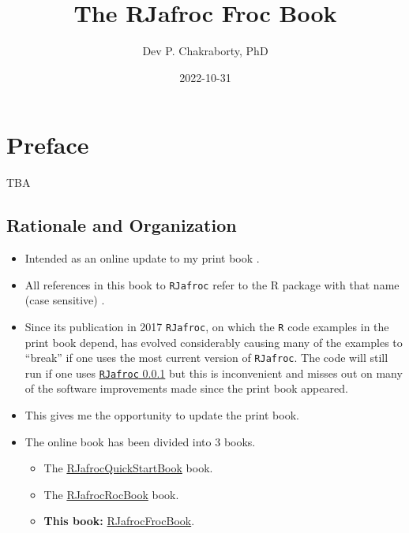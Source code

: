 \documentclass[
]{book}
\title{The RJafroc Froc Book}
\author{Dev P. Chakraborty, PhD}
\date{2022-10-31}
\providecommand{\tightlist}{%
  \setlength{\itemsep}{0pt}\setlength{\parskip}{0pt}}
\begin{document}
\maketitle

{
\setcounter{tocdepth}{1}
\tableofcontents
}
\hypertarget{preface}{%
\chapter*{Preface}\label{preface}}

TBA

\hypertarget{rationale-and-organization}{%
\section{Rationale and Organization}\label{rationale-and-organization}}

\begin{itemize}
\tightlist
\item
  Intended as an online update to my print book \citep{chakraborty2017observer}.
\item
  All references in this book to \texttt{RJafroc} refer to the R package with that name (case sensitive) \citep{R-RJafroc}.
\item
  Since its publication in 2017 \texttt{RJafroc}, on which the \texttt{R} code examples in the print book depend, has evolved considerably causing many of the examples to ``break'' if one uses the most current version of \texttt{RJafroc}. The code will still run if one uses \href{https://cran.r-project.org/src/contrib/Archive/RJafroc/}{\texttt{RJafroc} 0.0.1} but this is inconvenient and misses out on many of the software improvements made since the print book appeared.
\item
  This gives me the opportunity to update the print book.
\item
  The online book has been divided into 3 books.

  \begin{itemize}
  \tightlist
  \item
    The \href{https://dpc10ster.github.io/RJafrocQuickStart/}{RJafrocQuickStartBook} book.
  \item
    The \href{https://dpc10ster.github.io/RJafrocRocBook/}{RJafrocRocBook} book.
  \item
    \textbf{This book:} \href{https://dpc10ster.github.io/RJafrocFrocBook/}{RJafrocFrocBook}.
  \end{itemize}
\end{itemize}
\end{document}
